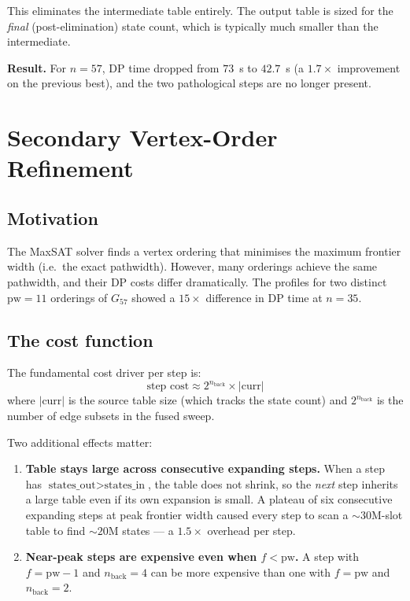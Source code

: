 \documentclass[12pt]{article}
\theoremstyle{definition}
\newcommand{\pw}{\mathrm{pw}}
\newcommand{\nb}{n_{\mathrm{back}}}
\begin{document}
This eliminates the intermediate table entirely.
The output table is sized for the \emph{final} (post-elimination) state count,
which is typically much smaller than the intermediate.

\textbf{Result.} For $n = 57$, DP time dropped from $73$~s to $42.7$~s
(a $1.7\times$ improvement on the previous best), and the two pathological
steps are no longer present.

\section{Secondary Vertex-Order Refinement}
\label{sec:ordering2}

\subsection{Motivation}

The MaxSAT solver finds a vertex ordering that minimises the maximum frontier
width (i.e.\ the exact pathwidth).
However, many orderings achieve the same pathwidth, and their DP costs differ
dramatically.
The profiles for two distinct $\pw = 11$ orderings of $G_{57}$ showed a
$15\times$ difference in DP time at $n = 35$.

\subsection{The cost function}

The fundamental cost driver per step is:
\begin{equation}
  \text{step cost} \approx 2^{\nb} \times |\text{curr}|
  \label{eq:step_cost}
\end{equation}
where $|\text{curr}|$ is the source table size (which tracks the state count)
and $2^{\nb}$ is the number of edge subsets in the fused sweep.

Two additional effects matter:
\begin{enumerate}[nosep]
  \item \textbf{Table stays large across consecutive expanding steps.}
        When a step has $\text{states\_out} > \text{states\_in}$, the table
        does not shrink, so the \emph{next} step inherits a large table even
        if its own expansion is small.
        A plateau of six consecutive expanding steps at peak frontier width
        caused every step to scan a $\sim\!30$M-slot table to find $\sim\!20$M
        states — a $1.5\times$ overhead per step.
  \item \textbf{Near-peak steps are expensive even when $f < \pw$.}
        A step with $f = \pw - 1$ and $\nb = 4$ can be more expensive than
        one with $f = \pw$ and $\nb = 2$.
\end{enumerate}
\end{document}
